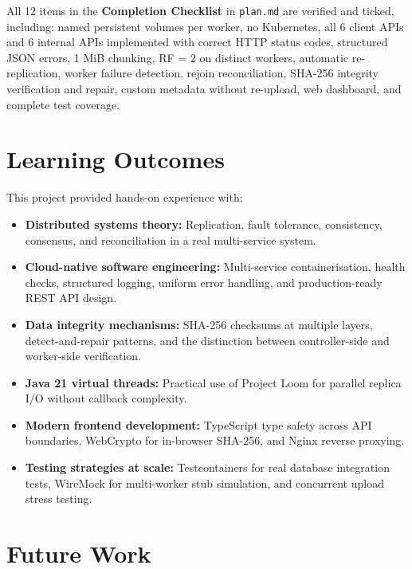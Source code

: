 \documentclass[12pt,a4paper]{report}
\begin{document}
All 12 items in the \textbf{Completion Checklist} in \texttt{plan.md} are verified and ticked, including: named persistent volumes per worker, no Kubernetes, all 6 client APIs and 6 internal APIs implemented with correct HTTP status codes, structured JSON errors, 1 MiB chunking, RF = 2 on distinct workers, automatic re-replication, worker failure detection, rejoin reconciliation, SHA-256 integrity verification and repair, custom metadata without re-upload, web dashboard, and complete test coverage.

\section{Learning Outcomes}

This project provided hands-on experience with:
\begin{itemize}
  \item \textbf{Distributed systems theory:} Replication, fault tolerance, consistency, consensus, and reconciliation in a real multi-service system.
  \item \textbf{Cloud-native software engineering:} Multi-service containerisation, health checks, structured logging, uniform error handling, and production-ready REST API design.
  \item \textbf{Data integrity mechanisms:} SHA-256 checksums at multiple layers, detect-and-repair patterns, and the distinction between controller-side and worker-side verification.
  \item \textbf{Java 21 virtual threads:} Practical use of Project Loom for parallel replica I/O without callback complexity.
  \item \textbf{Modern frontend development:} TypeScript type safety across API boundaries, WebCrypto for in-browser SHA-256, and Nginx reverse proxying.
  \item \textbf{Testing strategies at scale:} Testcontainers for real database integration tests, WireMock for multi-worker stub simulation, and concurrent upload stress testing.
\end{itemize}

\section{Future Work}
\end{document}

